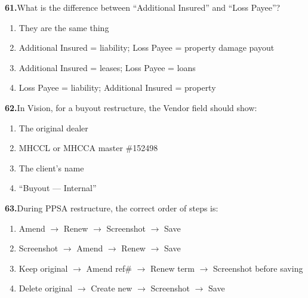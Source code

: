 \documentclass[11pt,letterpaper]{article}
\newif\ifshowsolutions
\newcommand{\answer}[1]{%
  \ifshowsolutions
    \begin{tcolorbox}[colback=green!5!white, colframe=answergreen, title={\small\textbf{Answer}}, fonttitle=\color{white}, coltitle=white, colbacktitle=answergreen, boxrule=0.5pt, arc=2pt, left=4pt, right=4pt, top=2pt, bottom=2pt]
    {\small #1}
    \end{tcolorbox}
  \fi
}
\begin{document}
\vspace{0.5em}

\noindent\textbf{61.}\quad What is the difference between ``Additional Insured'' and ``Loss Payee''?

\begin{enumerate}[label=\Alph*), leftmargin=2em, itemsep=0pt]
\item They are the same thing
\item Additional Insured = liability; Loss Payee = property damage payout
\item Additional Insured = leases; Loss Payee = loans
\item Loss Payee = liability; Additional Insured = property
\end{enumerate}
\answer{B) Additional Insured covers MHCCA against liability claims. Loss Payee ensures MHCCA receives payout if equipment is damaged/destroyed.}

\vspace{0.5em}

\noindent\textbf{62.}\quad In Vision, for a buyout restructure, the Vendor field should show:

\begin{enumerate}[label=\Alph*), leftmargin=2em, itemsep=0pt]
\item The original dealer
\item MHCCL or MHCCA master \#152498
\item The client's name
\item ``Buyout --- Internal''
\end{enumerate}
\answer{B) MHCCL or MHCCA master \#152498. Do NOT use ``MHCCA ABL'' or ``Lessor.''}

\vspace{0.5em}

\noindent\textbf{63.}\quad During PPSA restructure, the correct order of steps is:

\begin{enumerate}[label=\Alph*), leftmargin=2em, itemsep=0pt]
\item Amend $\rightarrow$ Renew $\rightarrow$ Screenshot $\rightarrow$ Save
\item Screenshot $\rightarrow$ Amend $\rightarrow$ Renew $\rightarrow$ Save
\item Keep original $\rightarrow$ Amend ref\# $\rightarrow$ Renew term $\rightarrow$ Screenshot before saving
\item Delete original $\rightarrow$ Create new $\rightarrow$ Screenshot $\rightarrow$ Save
\end{enumerate}
\answer{C) Keep original $\rightarrow$ Amend reference number $\rightarrow$ Renew term $\rightarrow$ Screenshot BEFORE saving.}
\end{document}
